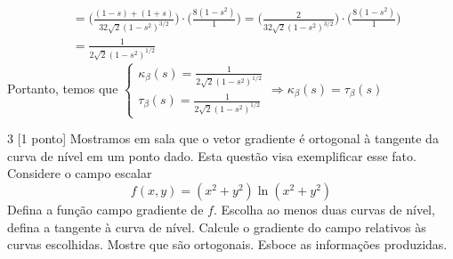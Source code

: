 \documentclass[../main.tex]{subfiles}
\begin{document}
\begin{solucao}
\begin{enumerate}
\begin{align*}
					&= \bigg(\frac{(1-s)+(1+s)}{32\sqrt{2}(1-s^2)^{3/2}}\bigg)\cdot\bigg(\frac{8(1-s^2)}{1}\bigg)=\bigg(\frac{2}{32\sqrt{2}(1-s^2)^{3/2}}\bigg)\cdot\bigg(\frac{8(1-s^2)}{1}\bigg)\\
					&=\frac{1}{2\sqrt{2}(1-s^2)^{1/2}}
				\end{align*}
				Portanto, temos que
				$\begin{cases} \kappa_{\beta}(s)=\frac{1}{2\sqrt{2}(1-s^2)^{1/2}}\\ \tau_{\beta}(s)=\frac{1}{2\sqrt{2}(1-s^2)^{1/2}}\end{cases}\Rightarrow\kappa_{\beta}(s)=\tau_{\beta}(s)$
			\end{enumerate}
		\end{solucao}
		
		\begin{exercicio}{3}
			[1 ponto] Mostramos em sala que o vetor gradiente é ortogonal à tangente da curva de nível em um ponto dado. Esta questão visa exemplificar esse fato. Considere o campo escalar
			\[
			f(x,y)=(x^2+y^2)\ln(x^2+y^2)
			\]
			Defina a função campo gradiente de $f$. Escolha ao menos duas curvas de nível, defina a tangente à curva de nível. Calcule o gradiente do campo relativos às curvas escolhidas. Mostre que são ortogonais. Esboce as informações produzidas.
		\end{exercicio}
\end{document}
